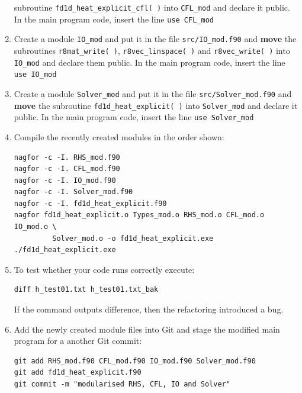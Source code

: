 \documentclass[12pt]{article}
\begin{document}
\begin{enumerate}
  subroutine \texttt{fd1d\_heat\_explicit\_cfl( )} into \texttt{CFL\_mod} and declare it
  public. In the main program
code, insert the line \texttt{use CFL\_mod}
\item Create a module \texttt{IO\_mod} and put it in the file \texttt{src/IO\_mod.f90} and {\bf move}
  the subroutines \texttt{r8mat\_write( )}, \texttt{r8vec\_linspace( )} and \texttt{r8vec\_write( )}
  into \texttt{IO\_mod} and declare them public. In the main program code, insert the line \texttt{use IO\_mod}
\item Create a module \texttt{Solver\_mod} and put it in the file \texttt{src/Solver\_mod.f90} and {\bf move} the
  subroutine \texttt{fd1d\_heat\_explicit( )} into \texttt{Solver\_mod} and declare it public. In the main
  program code, insert the line \texttt{use Solver\_mod}
\item Compile the recently created modules in the order shown:
\begin{verbatim}
nagfor -c -I. RHS_mod.f90
nagfor -c -I. CFL_mod.f90
nagfor -c -I. IO_mod.f90
nagfor -c -I. Solver_mod.f90
nagfor -c -I. fd1d_heat_explicit.f90
nagfor fd1d_heat_explicit.o Types_mod.o RHS_mod.o CFL_mod.o IO_mod.o \
         Solver_mod.o -o fd1d_heat_explicit.exe
./fd1d_heat_explicit.exe
\end{verbatim}
\item To test whether your code runs correctly execute:
\begin{verbatim}
diff h_test01.txt h_test01.txt_bak
\end{verbatim}
If the command outputs difference, then the refactoring introduced a bug.
\item Add the newly created module files into Git and stage the modified main program for a
another Git commit:
\begin{verbatim}
git add RHS_mod.f90 CFL_mod.f90 IO_mod.f90 Solver_mod.f90
git add fd1d_heat_explicit.f90
git commit -m "modularised RHS, CFL, IO and Solver"
\end{verbatim}
%
\end{enumerate}
\newpage
\end{document}
